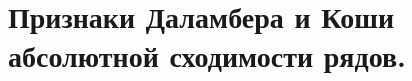 \documentclass[../main.tex]{subfiles}
\begin{document}
\newpage
\section{Признаки Даламбера и Коши абсолютной сходимости рядов.}
\end{document}
